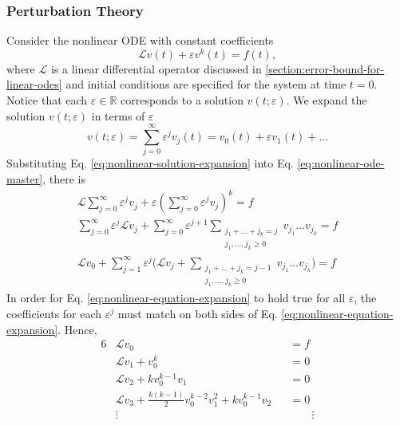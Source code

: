\documentclass[accepted]{uai2023}
\renewcommand{\L}{\mathcal{L}}
\begin{document}
\subsubsection{Perturbation Theory} \label{section:perturbation-theory}
    Consider the nonlinear ODE with constant coefficients
    \begin{equation} \label{eq:nonlinear-ode-master}
        \L v(t) + \varepsilon v^k(t) = f(t),
    \end{equation}
    where $\L$ is a linear differential operator discussed in \ref{section:error-bound-for-linear-odes} and initial conditions are specified for the system at time $t=0$. 
    Notice that each $\varepsilon \in \mathbb{R}$ corresponds to a solution $v(t; \varepsilon)$. 
    We expand the solution $v(t; \varepsilon)$ in terms of $\varepsilon$
    \begin{equation} \label{eq:nonlinear-solution-expansion}
        v(t; \varepsilon) = \sum_{j=0}^{\infty} \varepsilon^j v_j(t) = v_0(t) + \varepsilon v_1(t) + \dots
    \end{equation}
    Substituting Eq. \ref{eq:nonlinear-solution-expansion} into Eq. \ref{eq:nonlinear-ode-master}, there is
    {
        \small
        \begin{gather}
            \L \sum_{j=0}^{\infty} \varepsilon^j v_j + \varepsilon \left(\sum_{j=0}^{\infty} \varepsilon^j v_j\right)^k = f \\
            \sum_{j=0}^{\infty} \varepsilon^j \L v_j + \sum_{j=0}^{\infty} \varepsilon^{j+1} \sum_{\substack{j_1+\dots+j_k = j\\j_1, \dots, j_k \geq 0}}v_{j_1}\dots v_{j_k} = f \\[-0.5em]
            \L v_0 + \sum_{j=1}^{\infty} \varepsilon^j \Bigg(\L v_j + \sum_{\substack{j_1+\dots+j_k = j - 1\\j_1, \dots, j_k \geq 0}}v_{j_1}\dots v_{j_k}\Bigg)= f \label{eq:nonlinear-equation-expansion} 
        \end{gather}
    }
    In order for Eq. \ref{eq:nonlinear-equation-expansion} to hold true for all $\varepsilon$, the coefficients for each $\varepsilon^j$ must match on both sides of Eq. \ref{eq:nonlinear-equation-expansion}. Hence,
    {
        \small
        \begin{alignat}{6}
            &\L v_0 &&= f \label{eq:expansion-epsilon-0}\\
            &\L v_1 + v_0^k &&= 0 \label{eq:expansion-epsilon-1}\\
            &\L v_2 + k v_0^{k-1}v_1 &&= 0 \label{eq:expansion-epsilon-2} \\
            &\L v_3 + \frac{k(k-1)}{2} v_0^{k-2}v_1^2 + k v_0^{k-1}v_2 &&= 0 \label{eq:expansion-epsilon-3} \\[-1em]
            &\vdots &&\phantom{=}\,\,\,\,\vdots\nonumber
        \end{alignat}
    }
\end{document}
